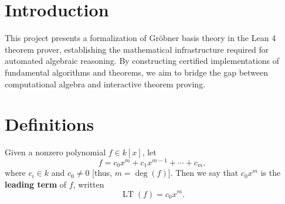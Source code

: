 %
%

\chapter{Introduction}
This project presents a formalization of Gröbner basis theory in the Lean 4 theorem prover, establishing the mathematical infrastructure required for automated algebraic reasoning. By constructing certified implementations of fundamental algorithms and theorems, we aim to bridge the gap between computational algebra and interactive theorem proving.

\chapter{Definitions}
\begin{definition}\label{Leading Term}
  \leanok
  Given a nonzero polynomial \( f \in k[x] \), let
  \[
  f = c_0 x^m + c_1 x^{m-1} + \cdots + c_m,
  \]
  where \( c_i \in k \) and \( c_0 \neq 0 \) [thus, \( m = \deg(f) \)]. Then we say that \( c_0 x^m \) is the \textbf{leading term} of \( f \), written
  \[
  \operatorname{LT}(f) = c_0 x^m.
  \]
\end{definition}

